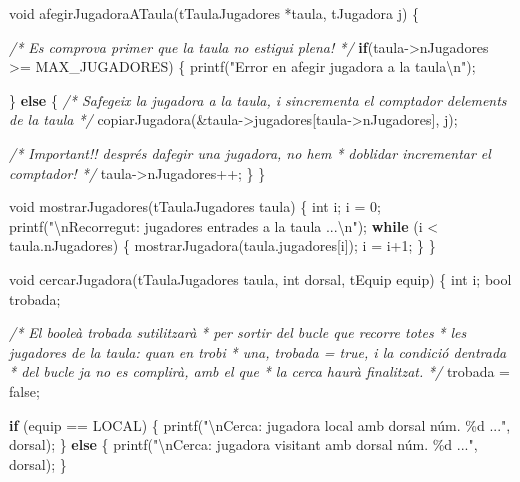 \documentclass[]{book}
\newenvironment{Shaded}{\begin{snugshade}}{\end{snugshade}}
\newcommand{\CommentTok}[1]{\textcolor[rgb]{0.56,0.35,0.01}{\textit{#1}}}
\newcommand{\ControlFlowTok}[1]{\textcolor[rgb]{0.13,0.29,0.53}{\textbf{#1}}}
\newcommand{\DataTypeTok}[1]{\textcolor[rgb]{0.13,0.29,0.53}{#1}}
\newcommand{\DecValTok}[1]{\textcolor[rgb]{0.00,0.00,0.81}{#1}}
\newcommand{\NormalTok}[1]{#1}
\newcommand{\SpecialCharTok}[1]{\textcolor[rgb]{0.00,0.00,0.00}{#1}}
\newcommand{\StringTok}[1]{\textcolor[rgb]{0.31,0.60,0.02}{#1}}
\begin{document}
\begin{Shaded}
\begin{Highlighting}[]
\DataTypeTok{void}\NormalTok{ afegirJugadoraATaula(tTaulaJugadores *taula, tJugadora j) \{}
    
    \CommentTok{/* Es comprova primer que la taula no estigui plena! */}
    \ControlFlowTok{if}\NormalTok{(taula{-}\textgreater{}nJugadores \textgreater{}= MAX\_JUGADORES) \{}
\NormalTok{        printf(}\StringTok{"Error en afegir jugadora a la taula}\SpecialCharTok{\textbackslash{}n}\StringTok{"}\NormalTok{);}
        
\NormalTok{    \} }\ControlFlowTok{else}\NormalTok{ \{}
        \CommentTok{/* S\textquotesingle{}afegeix la jugadora a la taula, i s\textquotesingle{}incrementa}
\CommentTok{           el comptador d\textquotesingle{}elements de la taula */}
\NormalTok{        copiarJugadora(\&taula{-}\textgreater{}jugadores[taula{-}\textgreater{}nJugadores], j);}
        
        \CommentTok{/* Important!! després d\textquotesingle{}afegir una jugadora, no hem}
\CommentTok{         * d\textquotesingle{}oblidar incrementar el comptador! */}
\NormalTok{        taula{-}\textgreater{}nJugadores++;}
\NormalTok{    \}}
\NormalTok{\}}

\DataTypeTok{void}\NormalTok{ mostrarJugadores(tTaulaJugadores taula) \{}
    \DataTypeTok{int}\NormalTok{ i;}
\NormalTok{    i = }\DecValTok{0}\NormalTok{;}
\NormalTok{    printf(}\StringTok{"}\SpecialCharTok{\textbackslash{}n}\StringTok{Recorregut: jugadores entrades a la taula ...}\SpecialCharTok{\textbackslash{}n}\StringTok{"}\NormalTok{);}
    \ControlFlowTok{while}\NormalTok{ (i \textless{} taula.nJugadores) \{}
\NormalTok{        mostrarJugadora(taula.jugadores[i]);}
\NormalTok{        i = i+}\DecValTok{1}\NormalTok{;}
\NormalTok{    \}}
\NormalTok{\}}

\DataTypeTok{void}\NormalTok{ cercarJugadora(tTaulaJugadores taula, }\DataTypeTok{int}\NormalTok{ dorsal, tEquip equip) \{}
    \DataTypeTok{int}\NormalTok{ i;}
    \DataTypeTok{bool}\NormalTok{ trobada;}
    
    \CommentTok{/* El booleà \textquotesingle{}trobada\textquotesingle{} s\textquotesingle{}utilitzarà}
\CommentTok{     * per sortir del bucle que recorre totes}
\CommentTok{     * les jugadores de la taula: quan en trobi}
\CommentTok{     * una, trobada = true, i la condició d\textquotesingle{}entrada}
\CommentTok{     * del bucle ja no es complirà, amb el que}
\CommentTok{     * la cerca haurà finalitzat.}
\CommentTok{     */}
\NormalTok{    trobada = false;}
    
    \ControlFlowTok{if}\NormalTok{ (equip == LOCAL) \{}
\NormalTok{        printf(}\StringTok{"}\SpecialCharTok{\textbackslash{}n}\StringTok{Cerca: jugadora local amb dorsal núm. \%d ..."}\NormalTok{, dorsal);}
\NormalTok{    \} }\ControlFlowTok{else}\NormalTok{ \{}
\NormalTok{        printf(}\StringTok{"}\SpecialCharTok{\textbackslash{}n}\StringTok{Cerca: jugadora visitant amb dorsal núm. \%d ..."}\NormalTok{, dorsal);}
\NormalTok{    \}}
    

\end{Highlighting}
\end{Shaded}
\end{document}
